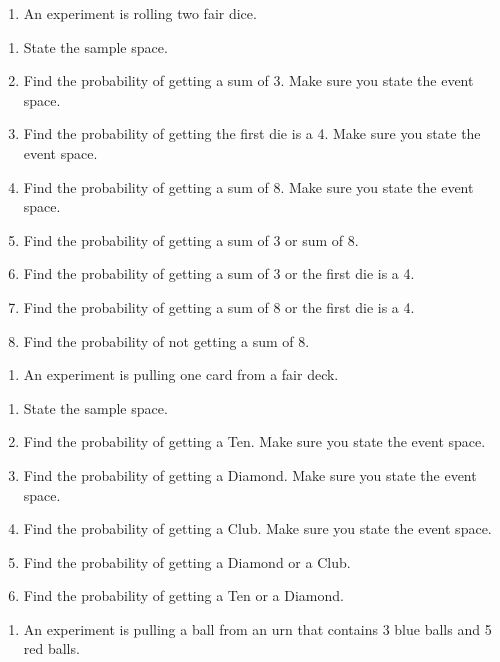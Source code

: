 \documentclass[]{book}
\providecommand{\tightlist}{%
  \setlength{\itemsep}{0pt}\setlength{\parskip}{0pt}}
\begin{document}
\begin{enumerate}
\def\labelenumi{\arabic{enumi}.}
\setcounter{enumi}{4}
\tightlist
\item
  An experiment is rolling two fair dice.
\end{enumerate}

\begin{enumerate}
\def\labelenumi{\alph{enumi}.}
\tightlist
\item
  State the sample space.
\item
  Find the probability of getting a sum of 3. Make sure you state the
  event space.
\item
  Find the probability of getting the first die is a 4. Make sure you
  state the event space.
\item
  Find the probability of getting a sum of 8. Make sure you state the
  event space.
\item
  Find the probability of getting a sum of 3 or sum of 8.
\item
  Find the probability of getting a sum of 3 or the first die is a 4.
\item
  Find the probability of getting a sum of 8 or the first die is a 4.
\item
  Find the probability of not getting a sum of 8.
\end{enumerate}

\begin{enumerate}
\def\labelenumi{\arabic{enumi}.}
\setcounter{enumi}{5}
\tightlist
\item
  An experiment is pulling one card from a fair deck.
\end{enumerate}

\begin{enumerate}
\def\labelenumi{\alph{enumi}.}
\tightlist
\item
  State the sample space.
\item
  Find the probability of getting a Ten. Make sure you state the event
  space.
\item
  Find the probability of getting a Diamond. Make sure you state the
  event space.
\item
  Find the probability of getting a Club. Make sure you state the
  event space.
\item
  Find the probability of getting a Diamond or a Club.
\item
  Find the probability of getting a Ten or a Diamond.
\end{enumerate}

\begin{enumerate}
\def\labelenumi{\arabic{enumi}.}
\setcounter{enumi}{6}
\tightlist
\item
  An experiment is pulling a ball from an urn that contains 3 blue
  balls and 5 red balls.
\end{enumerate}
\end{document}
